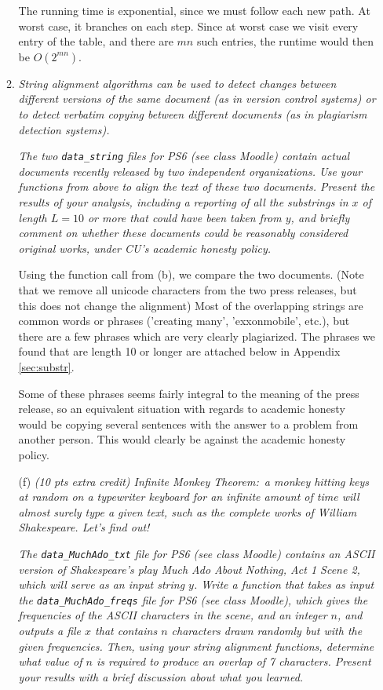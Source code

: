 \documentclass[12pt]{article}
\begin{document}
\begin{enumerate}
\begin{enumerate}
        	The running time is exponential, since we must follow each new path. At worst case, it branches on each step. Since at worst case we visit every entry of the table, and there are $mn$ such entries, the runtime would then be $\boxed{O(2^{mn})}$.
        	
        	\item \textit{String alignment algorithms can be used to detect changes between different versions of the same document (as in version control systems) or to detect verbatim copying between different documents (as in plagiarism detection systems).}
        	
        	\textit{The two {\tt data\_string} files for PS6 (see class Moodle) contain actual documents recently released by two independent organizations. Use your functions from above to align the text of these two documents. Present the results of your analysis, including a reporting of all the substrings in $x$ of length $L=10$ or more that could have been taken from $y$, and briefly comment on whether these documents could be reasonably considered original works, under CU's academic honesty policy.}
        	
        	Using the function call from (b), we compare the two documents. (Note that we remove all unicode characters from the two press releases, but this does not change the alignment) Most of the overlapping strings are common words or phrases ('creating many', 'exxonmobile', etc.), but there are a few phrases which are very clearly plagiarized. The phrases we found that are length 10 or longer are attached below in Appendix \ref{sec:substr}.
        	
        	Some of these phrases seems fairly integral to the meaning of the press release, so an equivalent situation with regards to academic honesty would be copying several sentences with the answer to a problem from another person. This would clearly be against the academic honesty policy.
        	
        	\item[(f)] \textit{(10 pts extra credit) Infinite Monkey Theorem:\ \textit{a monkey hitting keys at random on a typewriter keyboard for an infinite amount of time will almost surely type a given text, such as the complete works of William Shakespeare.} Let's find out!}
        	
        	\textit{The {\tt data\_MuchAdo\_txt} file for PS6 (see class Moodle) contains an ASCII version of Shakespeare's play \textit{Much Ado About Nothing}, Act 1 Scene 2, which will serve as an input string $y$. Write a function that takes as input the {\tt data\_MuchAdo\_freqs} file for PS6 (see class Moodle), which gives the frequencies of the ASCII characters in the scene, and an integer $n$, and outputs a file $x$ that contains $n$ characters drawn randomly but with the given frequencies. Then, using your string alignment functions, determine what value of $n$ is required to produce an overlap of 7 characters. Present your results with a brief discussion about what you learned.\\}
        	

\end{enumerate}
\end{enumerate}
\end{document}
